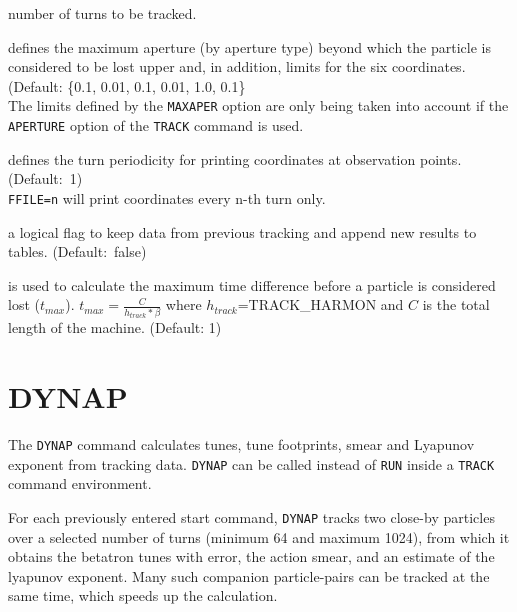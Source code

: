 \begin{madlist}
   number of turns to be tracked.

   defines the maximum aperture (by
  aperture type) beyond which the particle is considered
  to be lost upper and, in addition, limits for the six coordinates.\\
  (Default: \{0.1, 0.01, 0.1, 0.01, 1.0, 0.1\} \\
  The limits defined by the \texttt{MAXAPER} option are only being taken
  into account if the \texttt{APERTURE} option of the \texttt{TRACK}
  command is used. 

   defines the turn periodicity for printing coordinates at
   observation points. (Default:~1)\\

   \texttt{FFILE=n} will print coordinates every n-th turn only. 

    a logical flag to keep data from previous tracking and append new results to tables. (Default:~false)

    is used to calculate the maximum time difference before a particle is considered lost ($t_{max}$). 
    $t_{max} =\frac{C}{h_{track}*\beta}$ where $h_{track}$=TRACK\_HARMON and $C$ is the total length of the machine.  (Default: 1)
\end{madlist}



\section{DYNAP}

The \texttt{DYNAP} command calculates tunes, tune footprints, smear and
Lyapunov exponent from tracking data. \texttt{DYNAP} can be called
instead of \texttt{RUN} inside a \texttt{TRACK} command environment.

 
For each previously entered start command, \texttt{DYNAP} tracks two
close-by particles over a selected number of turns (minimum 64 and 
maximum 1024), from which it obtains the betatron tunes with error, 
the action smear, and an estimate of the lyapunov exponent. 
Many such companion particle-pairs can be tracked at the same time,
which speeds up the calculation.

